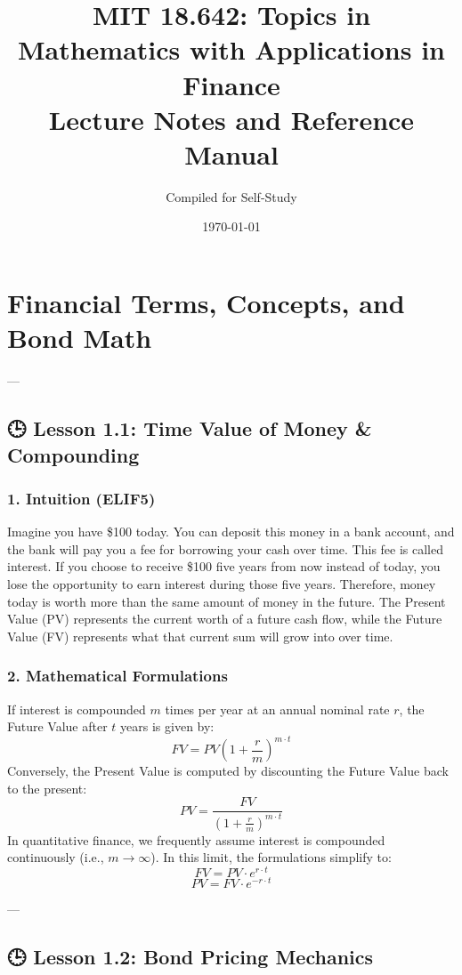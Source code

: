 \documentclass[11pt,oneside]{book}
\title{\textbf{MIT 18.642: Topics in Mathematics with Applications in Finance} \\ \Large Lecture Notes and Reference Manual}
\author{Compiled for Self-Study}
\date{\today}
\begin{document}
\maketitle

\tableofcontents

\newpage

\chapter{Financial Terms, Concepts, and Bond Math}

---

\section{🕒 Lesson 1.1: Time Value of Money \& Compounding}

\subsection{1. Intuition (ELIF5)}
Imagine you have \$100 today. You can deposit this money in a bank account, and the bank will pay you a fee for borrowing your cash over time. This fee is called interest. If you choose to receive \$100 five years from now instead of today, you lose the opportunity to earn interest during those five years. Therefore, money today is worth more than the same amount of money in the future. The Present Value (PV) represents the current worth of a future cash flow, while the Future Value (FV) represents what that current sum will grow into over time.

\subsection{2. Mathematical Formulations}
If interest is compounded $m$ times per year at an annual nominal rate $r$, the Future Value after $t$ years is given by:
$$FV = PV \left(1 + \frac{r}{m}\right)^{m \cdot t}$$
Conversely, the Present Value is computed by discounting the Future Value back to the present:
$$PV = \frac{FV}{\left(1 + \frac{r}{m}\right)^{m \cdot t}}$$
In quantitative finance, we frequently assume interest is compounded continuously (i.e., $m \to \infty$). In this limit, the formulations simplify to:
$$FV = PV \cdot e^{r \cdot t}$$
$$PV = FV \cdot e^{-r \cdot t}$$

---

\section{🕒 Lesson 1.2: Bond Pricing Mechanics}
\end{document}
